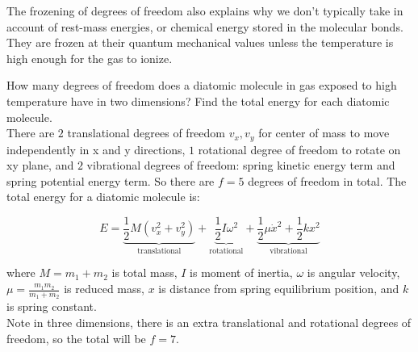 \documentclass[12pt, a4paper]{article}
\newcounter{exa}
\begin{document}
The frozening of degrees of freedom also explains why we don't typically take in account of rest-mass energies, or chemical energy stored in the molecular bonds. They are frozen at their quantum mechanical values unless the temperature is high enough for the gas to ionize.

\begin{texample}
How many degrees of freedom does a diatomic molecule in gas exposed to high temperature have in two dimensions? Find the total energy for each diatomic molecule. \\

There are $2$ translational degrees of freedom $v_x,v_y$ for center of mass to move independently in x and y directions, $1$ rotational degree of freedom to rotate on xy plane, and $2$ vibrational degrees of freedom: spring kinetic energy term and spring potential energy term. So there are $f=5$ degrees of freedom in total. The total energy for a diatomic molecule is:

$$E=\underbrace{\frac12M(v_x^2+v_y^2)}_{\text{translational}}+\underbrace{\frac12I\omega^2}_{\text{rotational}}+\underbrace{\frac12\mu \dot{x}^2+\frac12kx^2}_{\text{vibrational}}$$

where $M=m_1+m_2$ is total mass, $I$ is moment of inertia, $\omega$ is angular velocity, $\mu=\frac{m_1m_2}{m_1+m_2}$ is reduced mass, $x$ is distance from spring equilibrium position, and $k$ is spring constant. \\

Note in three dimensions, there is an extra translational and rotational degrees of freedom, so the total will be $f=7$.
\end{texample}
\end{document}
